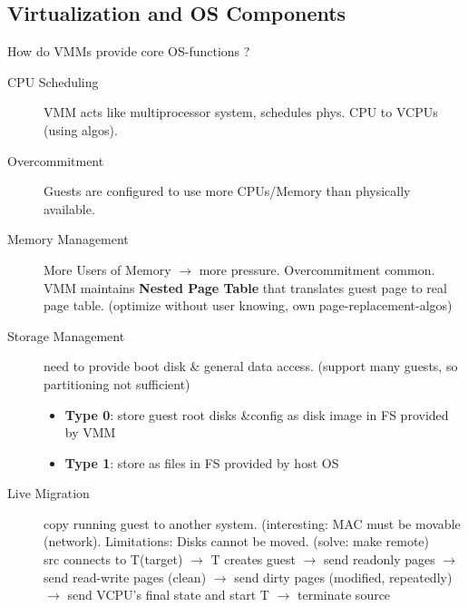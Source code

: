 \subsection*{Virtualization and OS Components}
How do VMMs provide core OS-functions ?
\begin{description}
    \item[CPU Scheduling]VMM acts like multiprocessor system, schedules phys. CPU to VCPUs (using algos). %
    \item[Overcommitment]Guests are configured to use more CPUs/Memory than physically available.
    \item[Memory Management] More Users of Memory $\rightarrow$ more pressure. Overcommitment common. VMM maintains \textbf{Nested Page Table} that translates guest page to real page table. (optimize without user knowing, own page-replacement-algos)
    \item[Storage Management] need to provide boot disk \& general data access. (support many guests, so partitioning not sufficient)
        \begin{itemize}[label={}, labelsep=0pt]
            \item \textbf{Type 0}: store guest root disks \&config as disk image in FS provided by VMM
            \item \textbf{Type 1}: store as files in FS provided by host OS %
        \end{itemize}
    \item[Live Migration]copy running guest to another system. (interesting: MAC must be movable (network). Limitations: Disks cannot be moved. (solve: make remote) \\
    src connects to T(target) $\rightarrow$ T creates guest $\rightarrow$ send readonly pages $\rightarrow$ send read-write pages (clean) $\rightarrow$ send dirty pages (modified, repeatedly) $\rightarrow$ send VCPU's final state and start T $\rightarrow$ terminate source
\end{description}

